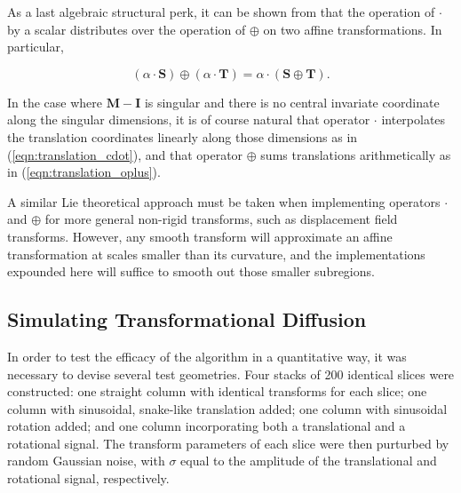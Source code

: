         As a last algebraic structural perk, it can be shown from  that the operation of $\cdot$ by a scalar distributes over the operation of $\oplus$ on two affine transformations. In particular,
        
        \begin{equation}
          (\alpha \cdot \mathbf{S}) \oplus (\alpha \cdot \mathbf{T}) = \alpha \cdot (\mathbf{S} \oplus \mathbf{T}).
        \end{equation}
        
        In the case where $\mathbf{M} - \mathbf{I}$ is singular and there is no central invariate coordinate along the singular dimensions, it is of course natural that operator $\cdot$ interpolates the translation coordinates linearly along those dimensions as in (\ref{eqn:translation_cdot}), and that operator $\oplus$ sums translations arithmetically as in (\ref{eqn:translation_oplus}).
        
        A similar Lie theoretical approach must be taken when implementing operators $\cdot$ and $\oplus$ for more general non-rigid transforms, such as displacement field transforms. However, any smooth transform will approximate an affine transformation at scales smaller than its curvature, and the implementations expounded here will suffice to smooth out those smaller subregions.
	
  \subsection{Simulating Transformational Diffusion} %
  \label{sub:simulating_transformational_diffusion}
  
  In order to test the efficacy of the algorithm in a quantitative way, it was necessary to devise several test geometries. Four stacks of 200 identical slices were constructed: one straight column with identical transforms for each slice; one column with sinusoidal, snake-like translation added; one column with sinusoidal rotation added; and one column incorporating both a translational and a rotational signal. The transform parameters of each slice were then purturbed by random Gaussian noise, with $\sigma$ equal to the amplitude of the translational and rotational signal, respectively.
  

